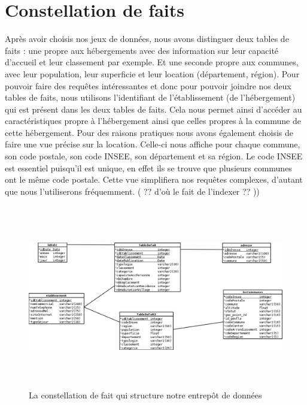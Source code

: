 \documentclass[a4paper,sffamily,12pt]{article}
\begin{document}
		\vspace{0.5cm}
		
	\section{Constellation de faits}

		\vspace{0.5cm}
			
		Après avoir choisis nos jeux de données, nous avons distinguer deux tables de faits : une propre aux hébergements avec des information sur leur capacité d'accueil et leur classement par exemple. Et une seconde propre aux communes, avec leur population, leur superficie et leur location (département, région). Pour pouvoir faire des requêtes intéressantes et donc pour pouvoir joindre nos deux tables de faits, nous utilisons l'identifiant de l'établissement (de l'hébergement) qui est présent dans les deux tables de faits. Cela nous permet ainsi d'accéder au caractéristiques propre à l'hébergement ainsi que celles propres à la commune de cette hébergement. Pour des raisons pratiques nous avons également choisis de faire une vue précise sur la location. Celle-ci nous affiche pour chaque commune, son code postale, son code INSEE, son département et sa région. Le code INSEE est essentiel puisqu'il est unique, en effet ils se trouve que plusieurs communes ont le même code postale. Cette vue simplifiera nos requêtes complexes, d'autant que nous l'utiliserons fréquemment. ( ?? d'où le fait de l’indexer ?? )) \\
	
		\vspace{0.5cm}
		
		\begin{figure}[!h]
				
			\centerline{\includegraphics[height=8cm]{picture/constellation_de_fait.png}}
			\caption{La constellation de fait qui structure notre entrepôt de données}
			\label{constellation}
			
		\end{figure}	
		
\end{document}
